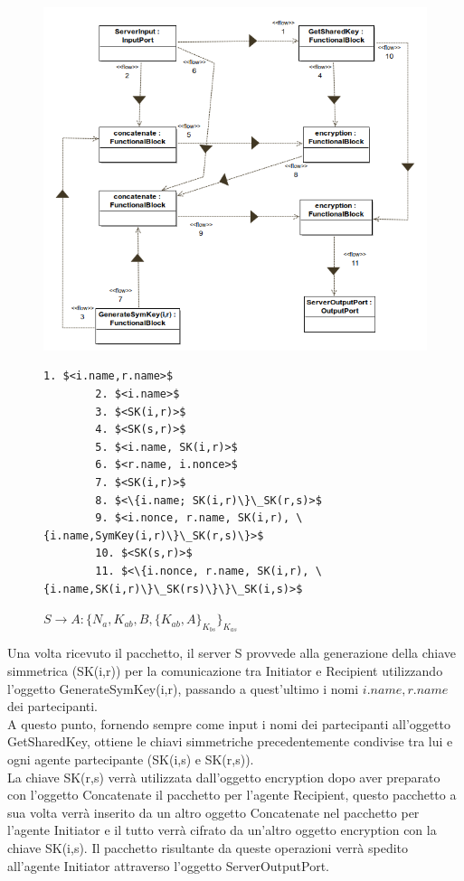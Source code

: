 \begin{figure}[h!] 
    \centering 
    \includegraphics[scale=0.5]{img/NSSK/Second_Message(fromServer).png} 
    \begin{lstlisting}[frame=single, mathescape, basicstyle=\footnotesize]
        1. $<i.name,r.name>$
        2. $<i.name>$
        3. $<SK(i,r)>$
        4. $<SK(s,r)>$
        5. $<i.name, SK(i,r)>$
        6. $<r.name, i.nonce>$
        7. $<SK(i,r)>$
        8. $<\{i.name; SK(i,r)\}\_SK(r,s)>$
        9. $<i.nonce, r.name, SK(i,r), \{i.name,SymKey(i,r)\}\_SK(r,s)\}>$
        10. $<SK(s,r)>$
        11. $<\{i.nonce, r.name, SK(i,r), \{i.name,SK(i,r)\}\_SK(rs)\}\}\_SK(i,s)>$
    \end{lstlisting}
    \caption{$S \rightarrow A : \{N_a, K_{ab}, B, \{K_{ab}, A\}_{K_{bs}}\}_{K_{as}}$} 
\end{figure}
\noindent Una volta ricevuto il pacchetto, il server S provvede alla generazione della chiave simmetrica (SK(i,r)) per la comunicazione tra Initiator e Recipient utilizzando l'oggetto GenerateSymKey(i,r), passando a quest'ultimo i nomi $i.name, r.name$ dei partecipanti.\\ 
A questo punto, fornendo sempre come input i nomi dei partecipanti all'oggetto GetSharedKey, ottiene le chiavi simmetriche precedentemente condivise tra lui e ogni agente partecipante (SK(i,s) e SK(r,s)).\\ 
La chiave SK(r,s) verrà utilizzata dall'oggetto encryption dopo aver preparato con l'oggetto Concatenate il pacchetto per l'agente Recipient, questo pacchetto a sua volta verrà inserito da un altro oggetto Concatenate nel pacchetto per l'agente Initiator e il tutto verrà cifrato da un'altro oggetto encryption con la chiave SK(i,s). Il pacchetto risultante da queste operazioni verrà spedito all'agente Initiator attraverso l'oggetto ServerOutputPort.\\

